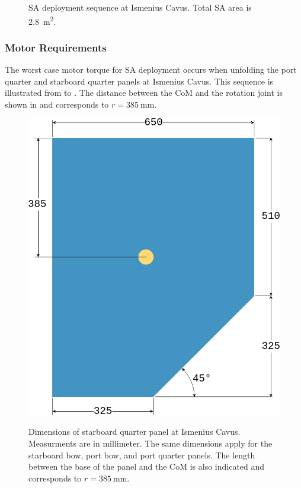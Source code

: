 \begin{figure}[h]
\begin{subfigure}[t]{\subfigureWidth}
		\label{fig:sub:deployment-sequence-ismenius-cavus-completed}
	\end{subfigure}
    \caption[Solar array deployment sequence at Ismenius Cavus]
    {\ac{SA} deployment sequence at Ismenius Cavus. Total \ac{SA} area is \SI{2.8}{\meter\squared}.}
	\label{fig:deployment-sequence-ismenius-cavus}
\vspace{-2ex}
\end{figure}

\clearpage
\subsubsection{Motor Requirements}
The worst case motor torque for \ac{SA} deployment occurs when unfolding the port quarter and starboard quarter panels at Ismenius Cavus. This sequence is illustrated from  to . The distance between the \ac{CoM} and the rotation joint is shown in  and corresponds to $r = \SI{385}{\milli\metre}$.

\vspace{0.25cm}

\begin{figure}[h]
  \captionsetup[subfigure]{justification=centering}
  \centering
  \hypersetup{linkcolor=captionTextColor}
  \includegraphics[width=0.45\linewidth]{sections/design/solar-array/images/ismenius-cavus-solar-panel-starboard-quarter.png}\\
  \caption[Dimensions of starboard quarter panel at Ismenius Cavus]
          {Dimensions of starboard quarter panel at Ismenius Cavus. Measurments are in millimeter. The same dimensions apply for the starboard bow, port bow, and port quarter panels. The length between the base of the panel and the \ac{CoM} is also indicated and corresponds to $r = \SI{385}{\milli\metre}$.}
  \label{fig:ismenius-cavus-solar-panel-starboard-quarter-dimensions}
\end{figure}

